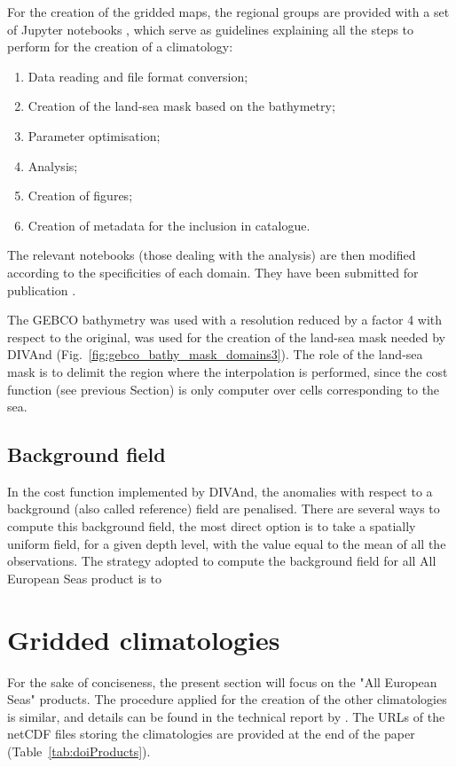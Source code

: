 \documentclass[essd, manuscript]{copernicus}
\begin{document}
For the creation of the gridded maps, the regional groups are provided with a set of Jupyter notebooks \citep[https://jupyter.org][]{KLUYVER2016}, which serve as guidelines explaining all the steps to perform for the creation of a climatology:
\begin{enumerate}
\item Data reading and file format conversion;
\item Creation of the land-sea mask based on the bathymetry;
\item Parameter optimisation;
\item Analysis;
\item Creation of figures;
\item Creation of metadata for the inclusion in catalogue.
\end{enumerate}
The relevant notebooks (those dealing with the analysis) are then modified according to the specificities of each domain. They have been submitted for publication \citep{TROUPIN2025}.

The GEBCO bathymetry \citep[2021 grid,][]{GEBCO2021} was used with a resolution reduced by a factor 4 with respect to the original, was used for the creation of the land-sea mask
needed by DIVAnd (Fig.~\ref{fig:gebco_bathy_mask_domains3}). The role of the land-sea mask is to delimit the region where the interpolation is performed, since the cost function (see previous Section) is only computer over cells corresponding to the sea.  

\subsection{Background field}

In the cost function implemented by DIVAnd, the anomalies with respect to a background (also called reference) field are penalised. There are several ways to compute this background field, the most direct option is to take a spatially uniform field, for a given depth level, with the value equal to the mean of all the observations. The strategy adopted to compute the background field for all All European Seas product is to 

\section{Gridded climatologies\label{sec:clim}}

For the sake of conciseness, the present section will focus on the "All European Seas" products. The procedure applied for the creation of the other climatologies is similar, and details can be found in the technical report by \citep{BUGA2021}. The URLs of the netCDF files storing the climatologies are provided at the end of the paper (Table~\ref{tab:doiProducts}).
\end{document}
